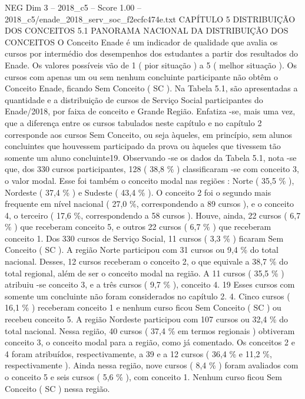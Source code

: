 \begin{textsample}{NEG Dim 3 – 2018\_c5 – Score 1.00 – 2018\_c5/enade\_2018\_serv\_soc\_f2ecfc474e.txt}  \label{ex:f3_neg_095}
CAPÍTULO 5 DISTRIBUIÇÃO DOS CONCEITOS 5.1 PANORAMA NACIONAL DA DISTRIBUIÇÃO DOS CONCEITOS O Conceito Enade é um indicador de qualidade que avalia os cursos por intermédio dos desempenhos dos estudantes a partir dos resultados do Enade.
Os valores possíveis vão de 1 ( pior situação ) a 5 ( melhor situação ).
Os cursos com apenas um ou sem nenhum concluinte participante não obtêm o Conceito Enade, ficando Sem Conceito ( SC ).
Na Tabela 5.1, são apresentadas a quantidade e a distribuição de cursos de Serviço Social participantes do Enade/2018, por faixa de conceito e Grande Região.
Enfatiza -se, mais uma vez, que a diferença entre os cursos tabulados neste capítulo e no capítulo 2 corresponde aos cursos Sem Conceito, ou seja àqueles, em princípio, sem alunos concluintes que houvessem participado da prova ou àqueles que tivessem tão somente um aluno concluinte19.
Observando -se os dados da Tabela 5.1, nota -se que, dos 330 cursos participantes, 128 ( 38,8 \% ) classificaram -se com conceito 3, o valor modal.
Esse foi também o conceito modal nas regiões : Norte ( 35,5 \% ), Nordeste ( 37,4 \% ) e Sudeste ( 43,4 \% ).
O conceito 2 foi o segundo mais frequente em nível nacional ( 27,0 \%, correspondendo a 89 cursos ), e o conceito 4, o terceiro ( 17,6 \%, correspondendo a 58 cursos ).
Houve, ainda, 22 cursos ( 6,7 \% ) que receberam conceito 5, e outros 22 cursos ( 6,7 \% ) que receberam conceito 1.
Dos 330 cursos de Serviço Social, 11 cursos ( 3,3 \% ) ficaram Sem Conceito ( SC ).
A região Norte participou com 31 cursos ou 9,4 \% do total nacional.
Desses, 12 cursos receberam o conceito 2, o que equivale a 38,7 \% do total regional, além de ser o conceito modal na região.
A 11 cursos ( 35,5 \% ) atribuiu -se conceito 3, e a três cursos ( 9,7 \% ), conceito 4. 19 Esses cursos com somente um concluinte não foram considerados no capítulo 2. 4.
Cinco cursos ( 16,1 \% ) receberam conceito 1 e nenhum curso ficou Sem Conceito ( SC ) ou recebeu conceito 5.
A região Nordeste participou com 107 cursos ou 32,4 \% do total nacional.
Nessa região, 40 cursos ( 37,4 \% em termos regionais ) obtiveram conceito 3, o conceito modal para a região, como já comentado.
Os conceitos 2 e 4 foram atribuídos, respectivamente, a 39 e a 12 cursos ( 36,4 \% e 11,2 \%, respectivamente ).
Ainda nessa região, nove cursos ( 8,4 \% ) foram avaliados com o conceito 5 e seis cursos ( 5,6 \% ), com conceito 1.
Nenhum curso ficou Sem Conceito ( SC ) nessa região.

\end{textsample}
